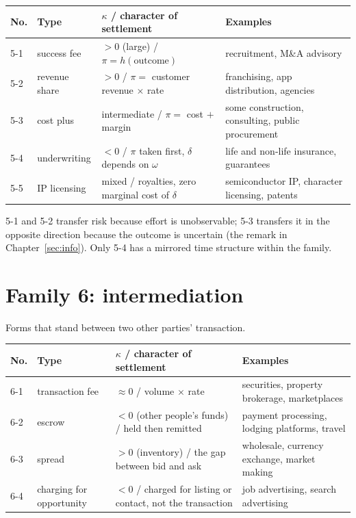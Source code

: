 \begin{center}
\begin{tabularx}{\textwidth}{@{}llXX@{}}
\toprule
No. & Type & $\kappa$ / character of settlement & Examples \\
\midrule
5-1 & success fee & $>0$ (large) / $\pi=h(\text{outcome})$ & recruitment, M\&A advisory \\
5-2 & revenue share & $>0$ / $\pi = $ customer revenue $\times$ rate & franchising, app distribution, agencies \\
5-3 & cost plus & intermediate / $\pi = $ cost $+$ margin & some construction, consulting, public procurement \\
5-4 & underwriting & $<0$ / $\pi$ taken first, $\delta$ depends on $\omega$ & life and non-life insurance, guarantees \\
5-5 & IP licensing & mixed / royalties, zero marginal cost of $\delta$ & semiconductor IP, character licensing, patents \\
\bottomrule
\end{tabularx}
\label{tab:family-5-catalog}
\end{center}

5-1 and 5-2 transfer risk because effort is unobservable; 5-3 transfers it in the opposite
direction because the outcome is uncertain (the remark in Chapter~\ref{sec:info}).
Only 5-4 has a mirrored time structure within the family.

\section{Family 6: intermediation}

Forms that stand between two other parties' transaction.

\begin{center}
\begin{tabularx}{\textwidth}{@{}llXX@{}}
\toprule
No. & Type & $\kappa$ / character of settlement & Examples \\
\midrule
6-1 & transaction fee & $\approx 0$ / volume $\times$ rate & securities, property brokerage, marketplaces \\
6-2 & escrow & $<0$ (other people's funds) / held then remitted & payment processing, lodging platforms, travel \\
6-3 & spread & $>0$ (inventory) / the gap between bid and ask & wholesale, currency exchange, market making \\
6-4 & charging for opportunity & $<0$ / charged for listing or contact, not the transaction & job advertising, search advertising \\
\bottomrule
\end{tabularx}
\label{tab:family-6-catalog}
\end{center}

